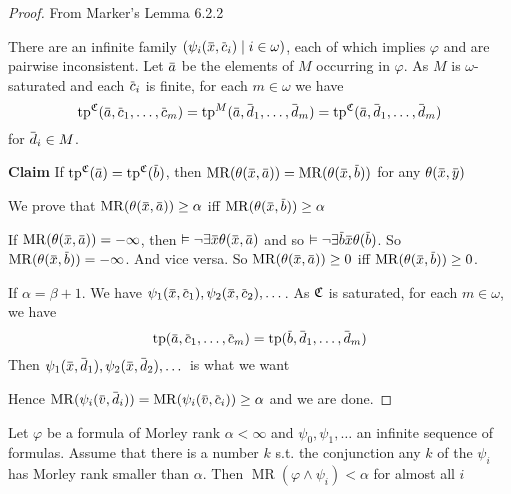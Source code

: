 \documentclass[11pt]{article}
\DeclareMathOperator{\MR}{MR}
\begin{document}
\begin{proof}
From Marker's Lemma 6.2.2

There are an infinite family \((\psi_i(\barx,\barc_i)\mid i\in\omega)\), each of which implies \(\varphi\) and are
pairwise inconsistent. Let \(\bara\) be the elements of \(M\) occurring in \(\varphi\). As \(M\) is
\(\omega\)-saturated and each \(\barc_i\) is finite, for each \(m\in\omega\) we have
\begin{equation*}
\tp^{\fC}(\bara,\barc_1,\dots,\barc_m)=\tp^{M}(\bara,\bard_1,\dots,\bard_m)=\tp^{\fC}(\bara,\bard_1,\dots,\bard_m)
\end{equation*}
for \(\bard_i\in M\).

\textbf{Claim} If \(\tp^{\fC}(\bara)=\tp^{\fC}(\barb)\), then \(\MR(\theta(\barx,\bara))=\MR(\theta(\barx,\barb))\) for
any \(\theta(\barx,\bary)\)

We prove that \(\MR(\theta(\barx,\bara))\ge\alpha\) iff \(\MR(\theta(\barx,\barb))\ge\alpha\)

If \(\MR(\theta(\barx,\bara))=-\infty\), then \(\vDash\neg\exists\barx\theta(\barx,\bara)\) and so \(\vDash\neg\exists\barb\barx\theta(\barb)\).
So \(\MR(\theta(\barx,\barb))=-\infty\). And vice versa. So \(\MR(\theta(\barx,\bara))\ge 0\)
iff \(\MR(\theta(\barx,\barb))\ge 0\).

If \(\alpha=\beta+1\). We have \(\psi_1(\barx,\barc_1),\psi_2(\barx,\barc_2),\dots\). As \(\mathfrak{C}\) is saturated, for
each \(m\in\omega\), we have
\begin{equation*}
\tp(\bara,\barc_1,\dots,\barc_m)=\tp(\barb,\bard_1,\dots,\bard_m)
\end{equation*}
Then \(\psi_1(\barx,\bard_1),\psi_2(\barx,\bard_2),\dots\) is what we want

Hence \(\MR(\psi_i(\barv,\bard_i))=\MR(\psi_i(\barv,\barc_i))\ge\alpha\) and we are done.
\end{proof}

\begin{exercise}
\label{ex6.2.2}
Let \(\varphi\) be a formula of Morley rank \(\alpha<\infty\) and \(\psi_0,\psi_1,\dots\) an infinite sequence of formulas.
Assume that there is a number \(k\) s.t. the conjunction any \(k\) of the \(\psi_i\) has Morley rank
smaller than \(\alpha\). Then \(\MR(\varphi\wedge\psi_i)<\alpha\)  for almost all \(i\)
\end{exercise}
\end{document}
